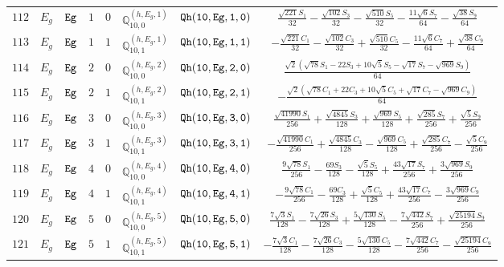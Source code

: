 \documentclass[fleqn,8pt]{jsarticle}
\begin{document}
\begin{table}[ht!]
\begin{center}
\begin{tabular}{cccccccc}
$ 112 $ & $ E_{g} $ & $ {\tt Eg} $ & $ 1 $ & $ 0 $ & $ \mathbb{Q}_{10,0}^{(h,E_{g},1)} $ & $ {\tt Qh(10,Eg,1,0)} $ & $ \frac{\sqrt{221} S_{1}}{32} - \frac{\sqrt{102} S_{3}}{32} - \frac{\sqrt{510} S_{5}}{32} - \frac{11 \sqrt{6} S_{7}}{64} - \frac{\sqrt{38} S_{9}}{64} $ \\
$ 113 $ & $ E_{g} $ & $ {\tt Eg} $ & $ 1 $ & $ 1 $ & $ \mathbb{Q}_{10,1}^{(h,E_{g},1)} $ & $ {\tt Qh(10,Eg,1,1)} $ & $ - \frac{\sqrt{221} C_{1}}{32} - \frac{\sqrt{102} C_{3}}{32} + \frac{\sqrt{510} C_{5}}{32} - \frac{11 \sqrt{6} C_{7}}{64} + \frac{\sqrt{38} C_{9}}{64} $ \\
$ 114 $ & $ E_{g} $ & $ {\tt Eg} $ & $ 2 $ & $ 0 $ & $ \mathbb{Q}_{10,0}^{(h,E_{g},2)} $ & $ {\tt Qh(10,Eg,2,0)} $ & $ \frac{\sqrt{2} \left(\sqrt{78} S_{1} - 22 S_{3} + 10 \sqrt{5} S_{5} - \sqrt{17} S_{7} - \sqrt{969} S_{9}\right)}{64} $ \\
$ 115 $ & $ E_{g} $ & $ {\tt Eg} $ & $ 2 $ & $ 1 $ & $ \mathbb{Q}_{10,1}^{(h,E_{g},2)} $ & $ {\tt Qh(10,Eg,2,1)} $ & $ - \frac{\sqrt{2} \left(\sqrt{78} C_{1} + 22 C_{3} + 10 \sqrt{5} C_{5} + \sqrt{17} C_{7} - \sqrt{969} C_{9}\right)}{64} $ \\
$ 116 $ & $ E_{g} $ & $ {\tt Eg} $ & $ 3 $ & $ 0 $ & $ \mathbb{Q}_{10,0}^{(h,E_{g},3)} $ & $ {\tt Qh(10,Eg,3,0)} $ & $ \frac{\sqrt{41990} S_{1}}{256} + \frac{\sqrt{4845} S_{3}}{128} + \frac{\sqrt{969} S_{5}}{128} + \frac{\sqrt{285} S_{7}}{256} + \frac{\sqrt{5} S_{9}}{256} $ \\
$ 117 $ & $ E_{g} $ & $ {\tt Eg} $ & $ 3 $ & $ 1 $ & $ \mathbb{Q}_{10,1}^{(h,E_{g},3)} $ & $ {\tt Qh(10,Eg,3,1)} $ & $ - \frac{\sqrt{41990} C_{1}}{256} + \frac{\sqrt{4845} C_{3}}{128} - \frac{\sqrt{969} C_{5}}{128} + \frac{\sqrt{285} C_{7}}{256} - \frac{\sqrt{5} C_{9}}{256} $ \\
$ 118 $ & $ E_{g} $ & $ {\tt Eg} $ & $ 4 $ & $ 0 $ & $ \mathbb{Q}_{10,0}^{(h,E_{g},4)} $ & $ {\tt Qh(10,Eg,4,0)} $ & $ \frac{9 \sqrt{78} S_{1}}{256} - \frac{69 S_{3}}{128} - \frac{\sqrt{5} S_{5}}{128} + \frac{43 \sqrt{17} S_{7}}{256} + \frac{3 \sqrt{969} S_{9}}{256} $ \\
$ 119 $ & $ E_{g} $ & $ {\tt Eg} $ & $ 4 $ & $ 1 $ & $ \mathbb{Q}_{10,1}^{(h,E_{g},4)} $ & $ {\tt Qh(10,Eg,4,1)} $ & $ - \frac{9 \sqrt{78} C_{1}}{256} - \frac{69 C_{3}}{128} + \frac{\sqrt{5} C_{5}}{128} + \frac{43 \sqrt{17} C_{7}}{256} - \frac{3 \sqrt{969} C_{9}}{256} $ \\
$ 120 $ & $ E_{g} $ & $ {\tt Eg} $ & $ 5 $ & $ 0 $ & $ \mathbb{Q}_{10,0}^{(h,E_{g},5)} $ & $ {\tt Qh(10,Eg,5,0)} $ & $ \frac{7 \sqrt{3} S_{1}}{128} - \frac{7 \sqrt{26} S_{3}}{128} + \frac{5 \sqrt{130} S_{5}}{128} - \frac{7 \sqrt{442} S_{7}}{256} + \frac{\sqrt{25194} S_{9}}{256} $ \\
$ 121 $ & $ E_{g} $ & $ {\tt Eg} $ & $ 5 $ & $ 1 $ & $ \mathbb{Q}_{10,1}^{(h,E_{g},5)} $ & $ {\tt Qh(10,Eg,5,1)} $ & $ - \frac{7 \sqrt{3} C_{1}}{128} - \frac{7 \sqrt{26} C_{3}}{128} - \frac{5 \sqrt{130} C_{5}}{128} - \frac{7 \sqrt{442} C_{7}}{256} - \frac{\sqrt{25194} C_{9}}{256} $ \\
 \hline \hline
\end{tabular}
\end{center}
\end{table}
\end{document}
